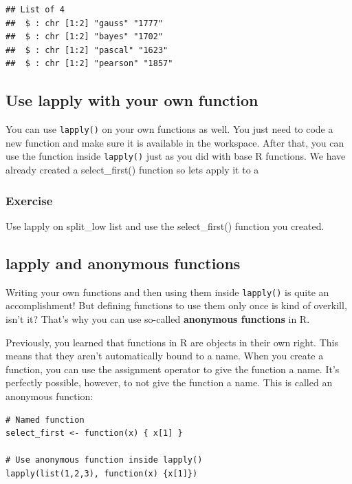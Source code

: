 \documentclass[
]{book}
\begin{document}
\begin{verbatim}
## List of 4
##  $ : chr [1:2] "gauss" "1777"
##  $ : chr [1:2] "bayes" "1702"
##  $ : chr [1:2] "pascal" "1623"
##  $ : chr [1:2] "pearson" "1857"
\end{verbatim}

\hypertarget{use-lapply-with-your-own-function}{%
\subsection{Use lapply with your own function}\label{use-lapply-with-your-own-function}}

You can use \texttt{lapply()} on your own functions as well. You just need to code a new function and make sure it is available in the workspace. After that, you can use the function inside \texttt{lapply()} just as you did with base R functions. We have already created a select\_first() function so lets apply it to a

\hypertarget{exercise-4}{%
\subsubsection*{Exercise}\label{exercise-4}}

Use lapply on split\_low list and use the select\_first() function you created.

\hypertarget{lapply-and-anonymous-functions}{%
\subsection{lapply and anonymous functions}\label{lapply-and-anonymous-functions}}

Writing your own functions and then using them inside \texttt{lapply()} is quite an accomplishment! But defining functions to use them only once is kind of overkill, isn't it? That's why you can use so-called \textbf{anonymous functions} in R.

Previously, you learned that functions in R are objects in their own right. This means that they aren't automatically bound to a name. When you create a function, you can use the assignment operator to give the function a name. It's perfectly possible, however, to not give the function a name. This is called an anonymous function:

\begin{verbatim}
# Named function
select_first <- function(x) { x[1] }

# Use anonymous function inside lapply()
lapply(list(1,2,3), function(x) {x[1]})
\end{verbatim}
\end{document}
